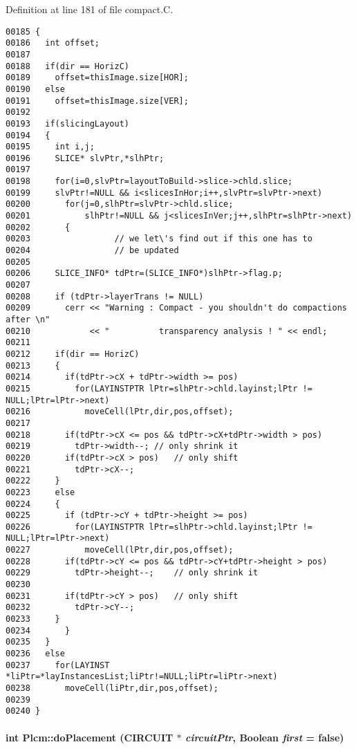 Definition at line 181 of file compact.C.\small\begin{verbatim}00185 {
00186   int offset;
00187 
00188   if(dir == HorizC)
00189     offset=thisImage.size[HOR];    
00190   else
00191     offset=thisImage.size[VER];    
00192   
00193   if(slicingLayout)
00194   {
00195     int i,j;
00196     SLICE* slvPtr,*slhPtr;
00197 
00198     for(i=0,slvPtr=layoutToBuild->slice->chld.slice;
00199     slvPtr!=NULL && i<slicesInHor;i++,slvPtr=slvPtr->next)
00200       for(j=0,slhPtr=slvPtr->chld.slice;
00201           slhPtr!=NULL && j<slicesInVer;j++,slhPtr=slhPtr->next)
00202       {
00203                 // we let\'s find out if this one has to 
00204                 // be updated
00205 
00206     SLICE_INFO* tdPtr=(SLICE_INFO*)slhPtr->flag.p;
00207     
00208     if (tdPtr->layerTrans != NULL)
00209       cerr << "Warning : Compact - you shouldn't do compactions after \n"
00210            << "          transparency analysis ! " << endl;
00211 
00212     if(dir == HorizC)
00213     {
00214       if(tdPtr->cX + tdPtr->width >= pos)         
00215         for(LAYINSTPTR lPtr=slhPtr->chld.layinst;lPtr != NULL;lPtr=lPtr->next)
00216           moveCell(lPtr,dir,pos,offset);
00217 
00218       if(tdPtr->cX <= pos && tdPtr->cX+tdPtr->width > pos)
00219         tdPtr->width--; // only shrink it
00220       if(tdPtr->cX > pos)   // only shift
00221         tdPtr->cX--;
00222     }
00223     else
00224     {
00225       if (tdPtr->cY + tdPtr->height >= pos)
00226         for(LAYINSTPTR lPtr=slhPtr->chld.layinst;lPtr != NULL;lPtr=lPtr->next)
00227           moveCell(lPtr,dir,pos,offset);
00228       if(tdPtr->cY <= pos && tdPtr->cY+tdPtr->height > pos)
00229         tdPtr->height--;    // only shrink it
00230 
00231       if(tdPtr->cY > pos)   // only shift
00232         tdPtr->cY--;
00233     }
00234       }
00235   }
00236   else
00237     for(LAYINST *liPtr=*layInstancesList;liPtr!=NULL;liPtr=liPtr->next)
00238       moveCell(liPtr,dir,pos,offset);
00239 
00240 }
\end{verbatim}\normalsize 
\label{Plcm_c8}
\paragraph{\setlength{\rightskip}{0pt plus 5cm}int Plcm::do\-Placement (CIRCUIT $\ast$ {\em circuit\-Ptr}, {\bf Boolean} {\em first} = false)\hspace{0.3cm}{\tt  [private]}}\hfill




